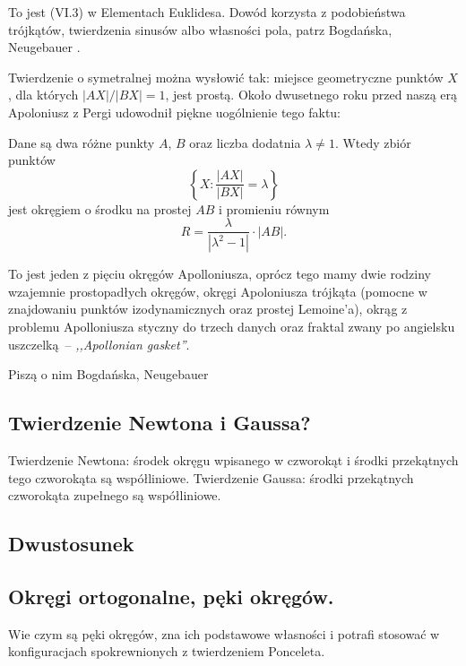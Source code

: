 To jest (VI.3) w Elementach Euklidesa.
Dowód korzysta z podobieństwa trójkątów, twierdzenia sinusów albo własności pola, patrz Bogdańska, Neugebauer \cite[s. 73]{neugebauer_2018}.




Twierdzenie o symetralnej %
można wysłowić tak: miejsce geometryczne punktów $X$, dla których $|AX|/|BX| = 1$, jest prostą.
Około dwusetnego roku przed naszą erą Apoloniusz z Pergi udowodnił piękne uogólnienie tego faktu:

\begin{definition}
	Dane są dwa różne punkty $A$, $B$ oraz liczba dodatnia $\lambda \neq 1$.
	Wtedy zbiór punktów 
	\begin{equation}
		\left\{X : \frac{|AX|}{|BX|} = \lambda \right\}
	\end{equation}
	jest okręgiem o środku na prostej $AB$ i promieniu równym
	\begin{equation}
		R = \frac{\lambda}{|\lambda^2 - 1|} \cdot |AB|.
	\end{equation}
\end{definition}

To jest jeden z pięciu okręgów Apolloniusza, oprócz tego mamy dwie rodziny wzajemnie prostopadłych okręgów, okręgi Apoloniusza trójkąta (pomocne w znajdowaniu punktów izodynamicznych oraz prostej Lemoine'a), okrąg z problemu Apolloniusza styczny do trzech danych oraz fraktal zwany po angielsku uszczelką -- \emph{,,Apollonian gasket''}.

Piszą o nim Bogdańska, Neugebauer \cite[s. 74]{neugebauer_2018}

\subsection{Twierdzenie Newtona i Gaussa?}
Twierdzenie Newtona: środek okręgu wpisanego w czworokąt i środki przekątnych tego czworokąta są współliniowe.
Twierdzenie Gaussa: środki przekątnych czworokąta zupełnego są współliniowe.

\subsection{Dwustosunek}

\subsection{Okręgi ortogonalne, pęki okręgów.}
Wie czym są pęki okręgów, zna ich podstawowe własności i potrafi stosować w konfiguracjach spokrewnionych z twierdzeniem Ponceleta.   

